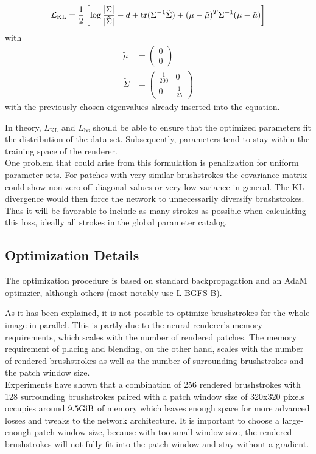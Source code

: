 \begin{align}
    \mathcal{L}_{\text{KL}} = \frac{1}{2}\left[\log\frac{|\Sigma|}{|\tilde{\Sigma}|} - d + \text{tr} ( \Sigma^{-1}\tilde{\Sigma} ) + (\mu - \tilde{\mu})^T \Sigma^{-1}(\mu - \tilde{\mu})\right]
\end{align}
with 
\begin{align}
    \tilde{\mu} & = \begin{pmatrix} 0 \\ 0 \end{pmatrix} \\
    \tilde{\Sigma} & = \begin{pmatrix} \frac{1}{200} & 0 \\ 0 & \frac{1}{25} \end{pmatrix}
\end{align}
with the previously chosen eigenvalues already inserted into the equation.

In theory, $L_{\text{KL}}$ and $L_{\text{bs}}$ should be able to ensure that the optimized parameters fit the distribution of the data set.
Subsequently, parameters tend to stay within the training space of the renderer.\\
One problem that could arise from this formulation is penalization for uniform parameter sets.
For patches with very similar brushstrokes the covariance matrix could show non-zero off-diagonal values or very low variance in general.
The KL divergence would then force the network to unnecessarily diversify brushstrokes.
Thus it will be favorable to include as many strokes as possible when calculating this loss, ideally all strokes in the global parameter catalog.

\subsection{Optimization Details}

The optimization procedure is based on standard backpropagation and an AdaM optimzier, although others (most notably \citeauthor*{gatys} use L-BGFS-B).

As it has been explained, it is not possible to optimize brushstrokes for the whole image in parallel.
This is partly due to the neural renderer's memory requirements, which scales with the number of rendered patches.
The memory requirement of placing and blending, on the other hand, scales with the number of rendered brushstrokes as well as the number of surrounding brushstrokes and the patch window size.\\
Experiments have shown that a combination of 256 rendered brushstrokes with 128 surrounding brushstrokes paired with a patch window size of 320x320 pixels occupies around $9.5 \si{\gibi \byte}$ of memory which leaves enough space for more advanced losses and tweaks to the network architecture.
It is important to choose a large-enough patch window size, because with too-small window size, the rendered brushstrokes will not fully fit into the patch window and stay without a gradient.

